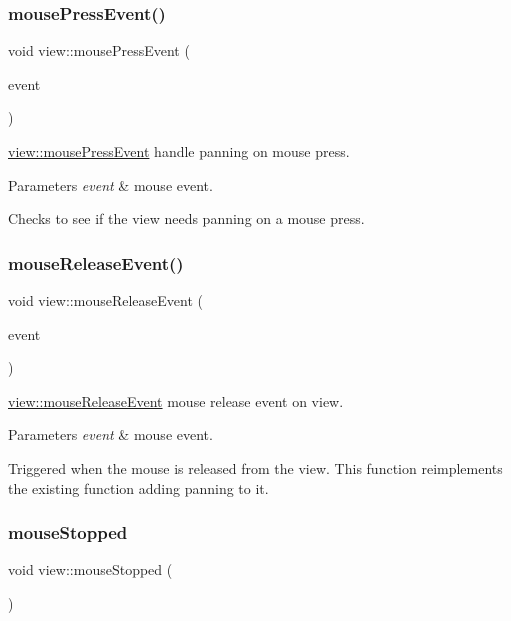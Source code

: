 \subsubsection{\texorpdfstring{mouse\+Press\+Event()}{mousePressEvent()}}
{\footnotesize\ttfamily void view\+::mouse\+Press\+Event (\begin{DoxyParamCaption}\item[{Q\+Mouse\+Event $\ast$}]{event }\end{DoxyParamCaption})}



\mbox{\hyperlink{classview_a7813d1b3e94e3c4db1ec0fa9143a1eca}{view\+::mouse\+Press\+Event}} handle panning on mouse press. 


\begin{DoxyParams}{Parameters}
{\em event} & mouse event.\\
\hline
\end{DoxyParams}
Checks to see if the view needs panning on a mouse press. \mbox{\label{classview_a57902641e912fe7549e04cc6a360d60c}} 
\subsubsection{\texorpdfstring{mouse\+Release\+Event()}{mouseReleaseEvent()}}
{\footnotesize\ttfamily void view\+::mouse\+Release\+Event (\begin{DoxyParamCaption}\item[{Q\+Mouse\+Event $\ast$}]{event }\end{DoxyParamCaption})}



\mbox{\hyperlink{classview_a57902641e912fe7549e04cc6a360d60c}{view\+::mouse\+Release\+Event}} mouse release event on view. 


\begin{DoxyParams}{Parameters}
{\em event} & mouse event.\\
\hline
\end{DoxyParams}
Triggered when the mouse is released from the view. This function reimplements the existing function adding panning to it. \mbox{\label{classview_ab1d79ebdee961d5ec07ed11f461158a5}} 
\subsubsection{\texorpdfstring{mouse\+Stopped}{mouseStopped}}
{\footnotesize\ttfamily void view\+::mouse\+Stopped (\begin{DoxyParamCaption}{ }\end{DoxyParamCaption})\hspace{0.3cm}{\ttfamily [slot]}}



